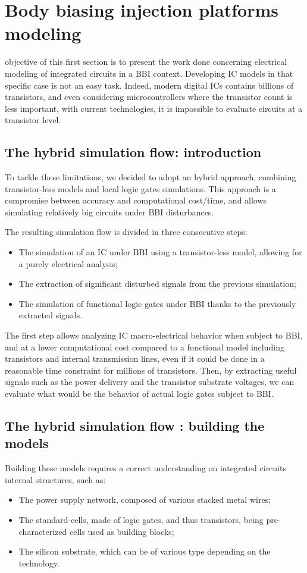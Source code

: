 
\section{Body biasing injection platforms modeling}
 objective of this first section is to present the work done concerning electrical modeling of integrated circuits in a BBI context.
Developing IC models in that specific case is not an easy task.
Indeed, modern digital ICs contains billions of transistors, and even considering microcontrollers where the transistor count is less important, with current technologies, it is impossible to evaluate circuits at a transistor level.

\subsection{The hybrid simulation flow: introduction}
To tackle these limitations, we decided to adopt an hybrid approach, combining transistor-less models and local logic gates simulations.
This approach is a compromise between accuracy and computational cost/time, and allows simulating relatively big circuits under BBI disturbances.

The resulting simulation flow is divided in three consecutive steps:
\begin{itemize}
	\item The simulation of an IC under BBI using a transistor-less model, allowing for a purely electrical analysis;
	\item The extraction of significant disturbed signals from the previous simulation;
	\item The simulation of functional logic gates under BBI thanks to the previously extracted signals.
\end{itemize}
The first step allows analyzing IC macro-electrical behavior when subject to BBI, and at a lower computational cost compared to a functional model including transistors and internal transmission lines, even if it could be done in a reasonable time constraint for millions of transistors.
Then, by extracting useful signals such as the power delivery and the transistor substrate voltages, we can evaluate what would be the behavior of actual logic gates subject to BBI.

\subsection{The hybrid simulation flow : building the models}
Building these models requires a correct understanding on integrated circuits internal structures, such as:
\begin{itemize}
	\item The power supply network, composed of various stacked metal wires;
	\item The standard-cells, made of logic gates, and thus transistors, being pre-characterized cells used as building blocks;
	\item The silicon substrate, which can be of various type depending on the technology.
\end{itemize}

